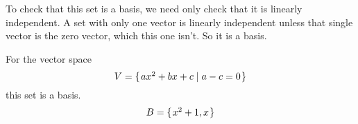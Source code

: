 \documentclass[answers, nolegalese, 11pt]{examjh}
\begin{document}
\begin{questions}
\begin{solution}
\begin{parts}
To check that this set is a basis, we need only check that it is 
linearly independent.
A set with only one vector is linearly independent unless that single
vector is the zero vector, which this one isn't.  
So it is a basis.
\end{parts}
\end{solution}

\question
For the vector space
\begin{equation*}
  V=\mbox{$\{\hspace{0.1em}ax^2+bx+c\mid a-c=0\hspace{0.1em}\}$}
\end{equation*}
this set is a basis.
\begin{equation*}
  B=\mbox{$\{\hspace{0.1em}x^2+1,x\hspace{0.1em}\}$}
\end{equation*}
\begin{solution}
\end{solution}


\end{questions}
\end{document}
